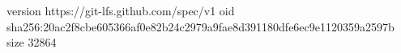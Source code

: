 version https://git-lfs.github.com/spec/v1
oid sha256:20ac2f8cbe605366af0e82b24c2979a9fae8d391180dfe6ec9e1120359a2597b
size 32864
